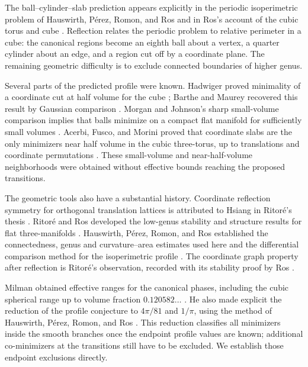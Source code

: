 \documentclass[11pt]{article}
\theoremstyle{remark}
\numberwithin{equation}{section}
\begin{document}
The ball--cylinder--slab prediction appears explicitly in the periodic
isoperimetric problem of Hauswirth, P\'erez, Romon, and Ros
\cite[Introduction]{HPRR} and in Ros's account of the cubic torus and cube
\cite[Section~1.6]{Ros}. Reflection relates the periodic problem to
relative perimeter in a cube: the canonical regions become an eighth
ball about a vertex, a quarter cylinder about an edge, and a region
cut off by a coordinate plane. The remaining geometric difficulty is to exclude
connected boundaries of higher genus.

Several parts of the predicted profile were known. Hadwiger proved
minimality of a coordinate cut at half volume for the cube
\cite{Hadwiger}; Barthe and Maurey recovered this result by Gaussian comparison
\cite[Theorem~7 and the following discussion]{BartheMaurey}.
Morgan and Johnson's sharp small-volume comparison implies that balls
minimize on a compact flat manifold for sufficiently small volumes
\cite[Theorem~4.4]{MorganJohnson}.
Acerbi, Fusco, and Morini proved that coordinate slabs are the only
minimizers near half volume in the cubic three-torus, up to translations
and coordinate permutations \cite[Theorem~5.3]{AcerbiFuscoMorini}.
These small-volume and near-half-volume neighborhoods were obtained
without effective bounds reaching the proposed transitions.

The geometric tools also have a substantial history. Coordinate
reflection symmetry for orthogonal translation lattices is attributed
to Hsiang in Ritor\'e's thesis \cite[Theorem~1.19]{RitoreThesis}.
Ritor\'e and Ros developed the low-genus stability and structure
results for flat three-manifolds \cite{RitoreRos92,RitoreRos96}.
Hauswirth, P\'erez, Romon, and Ros established the connectedness,
genus and curvature--area estimates used here and the differential
comparison method for the isoperimetric profile \cite{HPRR}.
The coordinate graph property after reflection is Ritor\'e's
observation, recorded with its stability proof by
Ros \cite[Proposition~2.3]{Ros}.

Milman obtained effective ranges for the canonical phases, including
the cubic spherical range up to volume fraction $0.120582\ldots$
\cite[Theorem~1.2]{Milman}. He also made explicit the reduction of the
profile conjecture to $4\pi/81$ and $1/\pi$, using the method of
Hauswirth, P\'erez, Romon, and Ros
\cite[Theorem~1.3 and Section~4.3]{Milman}. This reduction classifies
all minimizers inside the smooth branches once the endpoint profile
values are known; additional co-minimizers at the transitions still
have to be excluded. We establish those endpoint exclusions directly.
\end{document}
